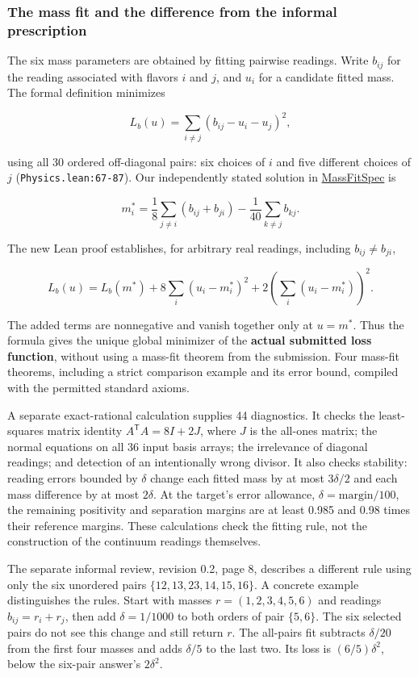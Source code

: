 \documentclass[
  11pt,
]{article}
\begin{document}
\subsubsection{The mass fit and the difference from the informal
prescription}\label{the-mass-fit-and-the-difference-from-the-informal-prescription}

The six mass parameters are obtained by fitting pairwise readings. Write
\(b_{ij}\) for the reading associated with flavors \(i\) and \(j\), and
\(u_i\) for a candidate fitted mass. The formal definition minimizes

\[
 L_b(u)=\sum_{i\ne j}(b_{ij}-u_i-u_j)^2,
\]

using all 30 ordered off-diagonal pairs: six choices of \(i\) and five
different choices of \(j\) ({\small \nolinkurl{Physics.lean:67-87}}).
Our independently stated solution in
\href{https://github.com/yang-mills-group/QCD/blob/main/checks/MassFitSpec.lean}{MassFitSpec}
is

\[
 m_i^*=\frac18\sum_{j\ne i}(b_{ij}+b_{ji})-
          \frac1{40}\sum_{k\ne j}b_{kj}.
\]

The new Lean proof establishes, for arbitrary real readings, including
\(b_{ij}\ne b_{ji}\),

\[
 L_b(u)=L_b(m^*)+8\sum_i(u_i-m_i^*)^2+
                   2\left(\sum_i(u_i-m_i^*)\right)^2.
\]

The added terms are nonnegative and vanish together only at \(u=m^*\).
Thus the formula gives the unique global minimizer of the \textbf{actual
submitted loss function}, without using a mass-fit theorem from the
submission. Four mass-fit theorems, including a strict comparison
example and its error bound, compiled with the permitted standard
axioms.

A separate exact-rational calculation supplies 44 diagnostics. It checks
the least-squares matrix identity \(A^{\mathsf T}A=8I+2J\), where \(J\)
is the all-ones matrix; the normal equations on all 36 input basis
arrays; the irrelevance of diagonal readings; and detection of an
intentionally wrong divisor. It also checks stability: reading errors
bounded by \(\delta\) change each fitted mass by at most \(3\delta/2\)
and each mass difference by at most \(2\delta\). At the target's error
allowance, \(\delta=\mathrm{margin}/100\), the remaining positivity and
separation margins are at least 0.985 and 0.98 times their reference
margins. These calculations check the fitting rule, not the construction
of the continuum readings themselves.

The separate informal review, revision 0.2, page 8, describes a
different rule using only the six unordered pairs
\(\{12,13,23,14,15,16\}\). A concrete example distinguishes the rules.
Start with masses \(r=(1,2,3,4,5,6)\) and readings \(b_{ij}=r_i+r_j\),
then add \(\delta=1/1000\) to both orders of pair \(\{5,6\}\). The six
selected pairs do not see this change and still return \(r\). The
all-pairs fit subtracts \(\delta/20\) from the first four masses and
adds \(\delta/5\) to the last two. Its loss is \((6/5)\delta^2\), below
the six-pair answer's \(2\delta^2\).
\end{document}
